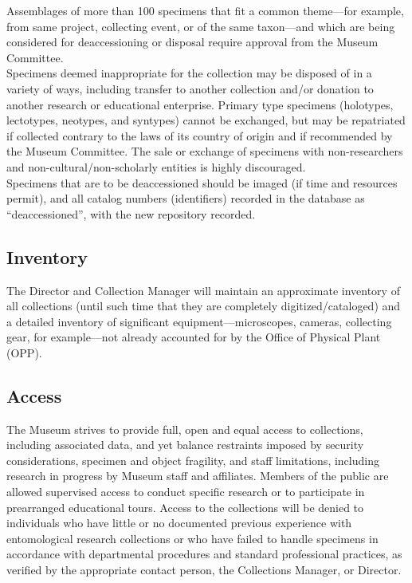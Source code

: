 \documentclass[letterpaper, 11pt]{article}
\begin{document}
\noindent{}Assemblages of more than 100 specimens that fit a common theme---for example, from same project, collecting event, or of the same taxon---and which are being considered for deaccessioning or disposal require approval from the Museum Committee.\\

\noindent{}Specimens deemed inappropriate for the collection may be disposed of in a variety of ways, including transfer to another collection and/or donation to another research or educational enterprise. Primary type specimens (holotypes, lectotypes, neotypes, and syntypes) cannot be exchanged, but may be repatriated if collected contrary to the laws of its country of origin and if recommended by the Museum Committee. The sale or exchange of specimens with non-researchers and non-cultural/non-scholarly entities is highly discouraged.\\

\noindent{}Specimens that are to be deaccessioned should be imaged (if time and resources permit), and all catalog numbers (identifiers) recorded in the database as ``deaccessioned'', with the new repository recorded.

\subsection{Inventory}
The Director and Collection Manager will maintain an approximate inventory of all collections (until such time that they are completely digitized/cataloged) and a detailed inventory of significant equipment---microscopes, cameras, collecting gear, for example---not already accounted for by the Office of Physical Plant (OPP).

\subsection{Access}
The Museum strives to provide full, open and equal access to collections, including associated data, and yet balance restraints imposed by security considerations, specimen and object fragility, and staff limitations, including research in progress by Museum staff and affiliates. Members of the public are allowed supervised access to conduct specific research or to participate in prearranged educational tours. Access to the collections will be denied to individuals who have little or no documented previous experience with entomological research collections or who have failed to handle specimens in accordance with departmental procedures and standard professional practices, as verified by the appropriate contact person, the Collections Manager, or Director.
\end{document}
